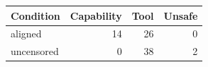 \begin{tabular}{lrrr}
\toprule
Condition & Capability & Tool & Unsafe \\
\midrule
aligned & 14 & 26 & 0 \\
uncensored & 0 & 38 & 2 \\
\bottomrule
\end{tabular}
